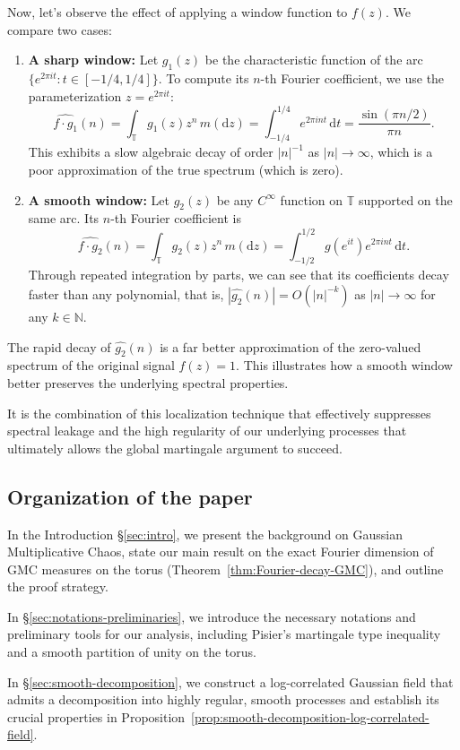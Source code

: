 \documentclass[12pt]{amsart}
\theoremstyle{definition}
\theoremstyle{remark}
\numberwithin{equation}{section}
\begin{document}
Now, let's observe the effect of applying a window function to $f(z)$. We compare two cases:
\begin{enumerate}
	\item \textbf{A sharp window:} Let $g_1(z)$ be the characteristic function of the arc $\{e^{2\pi i t}:t\in [-1/4, 1/4]\}$. To compute its $n$-th Fourier coefficient, we use the parameterization $z=e^{2\pi it}$:
	\[
	\widehat{f\cdot g_1}(n) = \int_{\mathbb{T}} g_1(z) z^n\,m(\mathrm{d}z) = \int_{-1/4}^{1/4} e^{2\pi i nt}\,\mathrm{d}t = \frac{\sin(\pi n/2)}{\pi n}.
	\]
	This exhibits a slow algebraic decay of order $|n|^{-1}$ as $|n|\to \infty$, which is a poor approximation of the true spectrum (which is zero).
	
	\item \textbf{A smooth window:} Let $g_2(z)$ be any $C^\infty$ function on $\mathbb{T}$ supported on the same arc. Its $n$-th Fourier coefficient is
	\[
	\widehat{f\cdot g_2}(n) = \int_{\mathbb{T}} g_2(z) z^n\,m(\mathrm{d}z)=\int_{-1/2}^{1/2}g(e^{it})e^{2\pi i nt}\,\mathrm{d}t.
	\]
	Through repeated integration by parts, we can see that its coefficients decay faster than any polynomial, that is, $|\widehat{g_2}(n)| = O(|n|^{-k})$ as $|n|\to \infty$ for any $k \in \mathbb{N}$.
\end{enumerate}
The rapid decay of $\widehat{g_2}(n)$ is a far better approximation of the zero-valued spectrum of the original signal $f(z)=1$. This illustrates how a smooth window better preserves the underlying spectral properties.

It is the combination of this localization technique that effectively suppresses spectral leakage and the high regularity of our underlying processes that ultimately allows the global martingale argument to succeed.

\subsection{Organization of the paper}
In the Introduction \S\ref{sec:intro}, we present the background on Gaussian Multiplicative Chaos, state our main result on the exact Fourier dimension of GMC measures on the torus (Theorem~\ref{thm:Fourier-decay-GMC}), and outline the proof strategy.

In \S\ref{sec:notations-preliminaries}, we introduce the necessary notations and preliminary tools for our analysis, including Pisier's martingale type inequality and a smooth partition of unity on the torus.

In \S\ref{sec:smooth-decomposition}, we construct a log-correlated Gaussian field that admits a decomposition into highly regular, smooth processes and establish its crucial properties in Proposition~\ref{prop:smooth-decomposition-log-correlated-field}.
\end{document}
